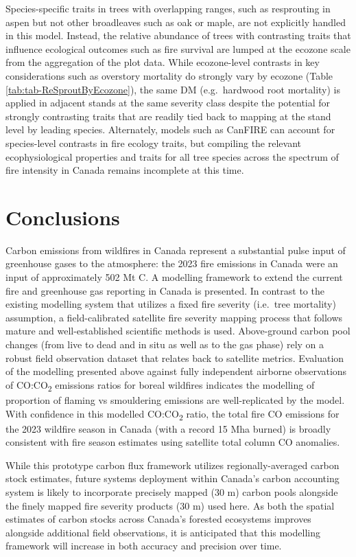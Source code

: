 \documentclass[, manuscript]{copernicus}
\begin{document}
Species-specific traits in trees with overlapping ranges, such as
resprouting in aspen \citep{brown1987} but not other broadleaves such as
oak or maple, are not explicitly handled in this model. Instead, the
relative abundance of trees with contrasting traits that influence
ecological outcomes such as fire survival are lumped at the ecozone
scale from the aggregation of the plot data. While ecozone-level
contrasts in key considerations such as overstory mortality do strongly
vary by ecozone (Table \ref{tab:tab-ReSproutByEcozone}), the same DM
(e.g.~hardwood root mortality) is applied in adjacent stands at the same
severity class despite the potential for strongly contrasting traits
that are readily tied back to mapping at the stand level by leading
species. Alternately, models such as CanFIRE can account for
species-level contrasts in fire ecology traits, but compiling the
relevant ecophysiological properties and traits for all tree species
across the spectrum of fire intensity in Canada remains incomplete at
this time.

\section{Conclusions}

Carbon emissions from wildfires in Canada represent a substantial pulse
input of greenhouse gases to the atmosphere: the 2023 fire emissions in
Canada were an input of approximately 502 Mt C. A modelling framework to
extend the current fire and greenhouse gas reporting in Canada is
presented. In contrast to the existing modelling system that utilizes a
fixed fire severity (i.e.~tree mortality) assumption, a field-calibrated
satellite fire severity mapping process that follows mature and
well-established scientific methods is used. Above-ground carbon pool
changes (from live to dead and in situ as well as to the gas phase) rely
on a robust field observation dataset that relates back to satellite
metrics. Evaluation of the modelling presented above against fully
independent airborne observations of CO:CO\textsubscript{2} emissions
ratios for boreal wildfires indicates the modelling of proportion of
flaming vs smouldering emissions are well-replicated by the model. With
confidence in this modelled CO:CO\textsubscript{2} ratio, the total fire
CO emissions for the 2023 wildfire season in Canada (with a record 15
Mha burned) is broadly consistent with fire season estimates using
satellite total column CO anomalies.

While this prototype carbon flux framework utilizes regionally-averaged
carbon stock estimates, future systems deployment within Canada's carbon
accounting system is likely to incorporate precisely mapped (30 m)
carbon pools alongside the finely mapped fire severity products (30 m)
used here. As both the spatial estimates of carbon stocks across
Canada's forested ecosystems improves alongside additional field
observations, it is anticipated that this modelling framework will
increase in both accuracy and precision over time.
\end{document}
